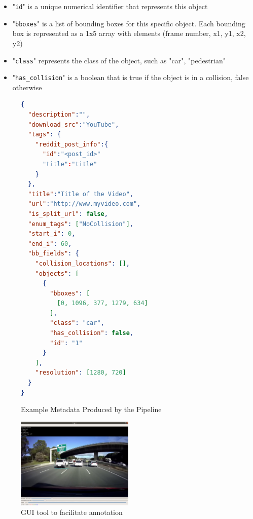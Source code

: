 \documentclass[letterpaper, 10 pt, conference]{IEEEconf}
\begin{document}
\begin{itemize}
\begin{itemize}
\begin{itemize}
      \item "\texttt{id}" is a  unique numerical identifier that represents this object
      \item "\texttt{bboxes}" is a list of bounding boxes for this specific object. Each bounding box is represented as a 1x5 array with elements (frame number, x1, y1, x2, y2)
      \item "\texttt{class}" represents the class of the object, such as "car", "pedestrian"
      \item "\texttt{has\_collision}" is a boolean that is true if the object is in a collision, false otherwise
    \end{itemize}
  \end{itemize}
\end{itemize}

\begin{figure}
  \begin{lstlisting}[language=json]
{
  "description":"",
  "download_src":"YouTube",
  "tags": {
    "reddit_post_info":{
      "id":"<post_id>"
      "title":"title"
    }
  },
  "title":"Title of the Video",
  "url":"http://www.myvideo.com",
  "is_split_url": false,
  "enum_tags": ["NoCollision"],
  "start_i": 0,
  "end_i": 60,
  "bb_fields": {
    "collision_locations": [],
    "objects": [
      {
        "bboxes": [
          [0, 1096, 377, 1279, 634]
        ],
        "class": "car",
        "has_collision": false,
        "id": "1"
      }
    ],
    "resolution": [1280, 720]
  }
}
  \end{lstlisting}
    \caption{Example Metadata Produced by the Pipeline}
    \label{metadata_example}
\end{figure}

\begin{figure}[htpb]
		\centering
    \includegraphics[width=0.5\textwidth]{example_gui_tool.png}
		\caption{GUI tool to facilitate annotation}
		\label{fig:example_gui_tool-png}
\end{figure}
\end{document}
